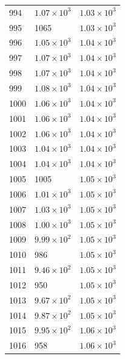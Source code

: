 \begin{table}[H]
\begin{tabular}{lll}
994 & $\displaystyle 1.07 \times 10^{3}$ & $\displaystyle 1.03 \times 10^{3}$ \\
995 & 1065 & $\displaystyle 1.03 \times 10^{3}$ \\
996 & $\displaystyle 1.05 \times 10^{3}$ & $\displaystyle 1.04 \times 10^{3}$ \\
997 & $\displaystyle 1.07 \times 10^{3}$ & $\displaystyle 1.04 \times 10^{3}$ \\
998 & $\displaystyle 1.07 \times 10^{3}$ & $\displaystyle 1.04 \times 10^{3}$ \\
999 & $\displaystyle 1.08 \times 10^{3}$ & $\displaystyle 1.04 \times 10^{3}$ \\
1000 & $\displaystyle 1.06 \times 10^{3}$ & $\displaystyle 1.04 \times 10^{3}$ \\
1001 & $\displaystyle 1.06 \times 10^{3}$ & $\displaystyle 1.04 \times 10^{3}$ \\
1002 & $\displaystyle 1.06 \times 10^{3}$ & $\displaystyle 1.04 \times 10^{3}$ \\
1003 & $\displaystyle 1.04 \times 10^{3}$ & $\displaystyle 1.04 \times 10^{3}$ \\
1004 & $\displaystyle 1.04 \times 10^{3}$ & $\displaystyle 1.04 \times 10^{3}$ \\
1005 & 1005 & $\displaystyle 1.05 \times 10^{3}$ \\
1006 & $\displaystyle 1.01 \times 10^{3}$ & $\displaystyle 1.05 \times 10^{3}$ \\
1007 & $\displaystyle 1.03 \times 10^{3}$ & $\displaystyle 1.05 \times 10^{3}$ \\
1008 & $\displaystyle 1.00 \times 10^{3}$ & $\displaystyle 1.05 \times 10^{3}$ \\
1009 & $\displaystyle 9.99 \times 10^{2}$ & $\displaystyle 1.05 \times 10^{3}$ \\
1010 & 986 & $\displaystyle 1.05 \times 10^{3}$ \\
1011 & $\displaystyle 9.46 \times 10^{2}$ & $\displaystyle 1.05 \times 10^{3}$ \\
1012 & 950 & $\displaystyle 1.05 \times 10^{3}$ \\
1013 & $\displaystyle 9.67 \times 10^{2}$ & $\displaystyle 1.05 \times 10^{3}$ \\
1014 & $\displaystyle 9.87 \times 10^{2}$ & $\displaystyle 1.05 \times 10^{3}$ \\
1015 & $\displaystyle 9.95 \times 10^{2}$ & $\displaystyle 1.06 \times 10^{3}$ \\
1016 & 958 & $\displaystyle 1.06 \times 10^{3}$ \\

\end{tabular}
\end{table}
